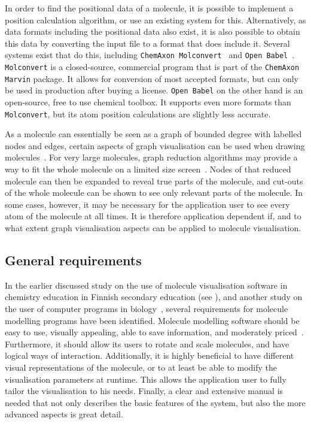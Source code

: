 In order to find the positional data of a molecule, it is possible to implement a position calculation algorithm, or use an existing system for this. Alternatively, as data formats including the positional data also exist, it is also possible to obtain this data by converting the input file to a format that does include it. Several systems exist that do this, including \verb|ChemAxon Molconvert|~\cite{chemaxon2014molecule} and \verb|Open Babel|~\cite{oboyle2011open}. \verb|Molconvert| is a closed-source, commercial program that is part of the \verb|ChemAxon Marvin| package. It allows for conversion of most accepted formats, but can only be used in production after buying a license. \verb|Open Babel| on the other hand is an open-source, free to use chemical toolbox. It supports even more formats than \verb|Molconvert|, but its atom position calculations are slightly less accurate.

As a molecule can essentially be seen as a graph of bounded degree with labelled nodes and edges, certain aspects of graph visualisation can be used when drawing molecules~\cite{boissonnat2001structure}. For very large molecules, graph reduction algorithms may provide a way to fit the whole molecule on a limited size screen~\cite{batagelj2004pajek}. Nodes of that reduced molecule can then be expanded to reveal true parts of the molecule, and cut-outs of the whole molecule can be shown to see only relevant parts of the molecule. In some cases, however, it may be necessary for the application user to see every atom of the molecule at all times. It is therefore application dependent if, and to what extent graph visualisation aspects can be applied to molecule visualisation.

\subsection{General requirements}
In the earlier discussed study on the use of molecule visualisation software in chemistry education in Finnish secondary education (see ), and another study on the user of computer programs in biology~\cite{taylor2013interface}, several requirements for molecule modelling programs have been identified. Molecule modelling software should be easy to use, visually appealing, able to save information, and moderately priced~\cite{aksela2008computer}. Furthermore, it should allow its users to rotate and scale molecules, and have logical ways of interaction. Additionally, it is highly beneficial to have different visual representations of the molecule, or to at least be able to modify the visualisation parameters at runtime. This allows the application user to fully tailor the visualisation to his needs. Finally, a clear and extensive manual is needed that not only describes the basic features of the system, but also the more advanced aspects is great detail.


